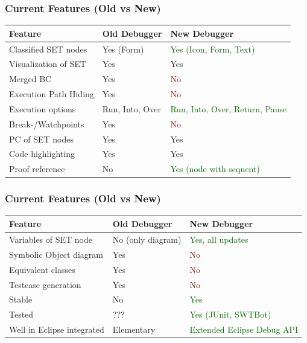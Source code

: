 \documentclass[accentcolor=tud9d,colorbacktitle,inverttitle,landscape,english,presentation,t]{tudbeamer}
\begin{document}
   	\begin{frame}[t]
		\frametitle{Current Features (Old vs New)}
      
      \begin{table}
         \centering
            \begin{tabular}{|l|l|l|}
               \hline
               Feature & Old Debugger & New Debugger \\
               \hline
               \hline
               Classified SET nodes & Yes (Form) & \textcolor{darkgreen}{Yes (Icon, Form, Text)} \\
               Visualization of SET & Yes & Yes \\
               Merged BC & Yes & \textcolor{darkred}{No} \\
               Execution Path Hiding & Yes & \textcolor{darkred}{No} \\ %
               Execution options & Run, Into, Over & \textcolor{darkgreen}{Run, Into, Over, Return, Pause} \\
               Break-/Watchpoints & Yes & \textcolor{darkred}{No} \\
               PC of SET nodes & Yes & Yes \\
               Code highlighting & Yes & Yes \\
               Proof reference & No & \textcolor{darkgreen}{Yes (node with sequent)} \\
               \hline
            \end{tabular}
      \end{table}
	\end{frame}
   
   \begin{frame}[t]
		\frametitle{Current Features (Old vs New)}
      
      \begin{table}
         \centering
            \begin{tabular}{|l|l|l|}
               \hline
               Feature & Old Debugger & New Debugger \\
               \hline
               \hline
               Variables of SET node & No (only diagram) & \textcolor{darkgreen}{Yes, all updates} \\
               Symbolic Object diagram & Yes & \textcolor{darkred}{No} \\
               Equivalent classes & Yes & \textcolor{darkred}{No} \\
               \hline
               Testcase generation & Yes & \textcolor{darkred}{No} \\
               \hline
               Stable & No & \textcolor{darkgreen}{Yes} \\
               Tested & ??? & \textcolor{darkgreen}{Yes (JUnit, SWTBot)} \\
               Well in Eclipse integrated & Elementary & \textcolor{darkgreen}{Extended Eclipse Debug API} \\
               \hline
            \end{tabular}
      \end{table}
	\end{frame}
\end{document}
